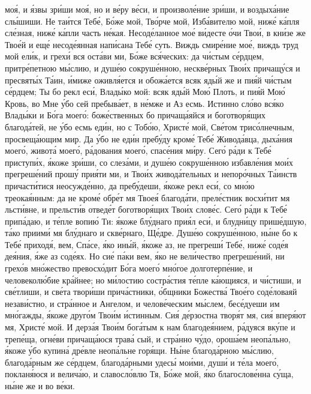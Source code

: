 моя́, и я́звы зри́ши моя́, но и ве́ру ве́си, и произволе́ние зри́ши, и
воздыха́ние слы́шиши. Не таи́тся Тебе́, Бо́же мой, Тво́рче мой, Изба́вителю
мой, ниже́ ка́пля сле́зная, ниже́ ка́пли часть не́кая. Несоде́ланное мое́
ви́десте о́чи Твои́, в кни́зе же Твое́й и еще́ несоде́янная напи́сана Тебе́
суть. Виждь смире́ние мое́, виждь труд мой ели́к, и грехи́ вся оста́ви
ми, Бо́же вся́ческих: да чи́стым се́рдцем, притре́петною мы́слию, и
душе́ю сокруше́нною, нескве́рных Твои́х причащу́ся и пресвяты́х
Та́ин, и́миже оживля́ется и обожа́ется всяк яды́й же и пия́й чи́стым
се́рдцем; Ты бо рекл еси́, Влады́ко мой: всяк яды́й Мою́ Плоть, и пия́й
Мою́ Кровь, во Мне у́бо сей пребыва́ет, в не́мже и Аз есмь. Истинно
сло́во вся́ко Влады́ки и Бо́га моего́: боже́ственных бо причаща́яйся и
боготворя́щих благода́тей, не у́бо есмь еди́н, но с Тобо́ю, Христе́ мой,
Све́том трисо́лнечным, просвеща́ющим мир. Да у́бо не еди́н пребу́ду
кроме́ Тебе́ Живода́вца, дыха́ния моего́, живота́ моего́, ра́дования
моего́, спасе́ния ми́ру. Сего́ ра́ди к Тебе́ приступи́х, я́коже зри́ши,
со слеза́ми, и душе́ю сокруше́нною избавле́ния мои́х прегреше́ний
прошу́ прия́ти ми, и Твои́х живода́тельных и непоро́чных Та́инств
причасти́тися неосужде́нно, да пребу́деши, я́коже рекл еси́, со мно́ю
треокая́нным: да не кроме́ обре́т мя Твоея́ благода́ти, преле́стник восхи́тит
мя льсти́вне, и прельсти́в отведе́т боготворя́щих Твои́х слове́с. Сего́ ра́ди
к Тебе́ припа́даю, и те́пле вопию́ Ти: я́коже блу́днаго прия́л еси́, и
блудни́цу прише́дшую, та́ко приими́ мя блу́днаго и скве́рнаго, Ще́дре.
Душе́ю сокруше́нною, ны́не бо к Тебе́ приходя́, вем, Спа́се, я́ко ины́й,
я́коже аз, не прегреши́ Тебе́, ниже́ соде́я дея́ния, я́же аз соде́ях. Но
сие́ па́ки вем, я́ко не вели́чество прегреше́ний, ни грехо́в мно́жество
превосхо́дит Бо́га моего́ мно́гое долготерпе́ние, и человеколю́бие кра́йнее; но
ми́лостию состра́стия те́пле ка́ющияся, и чи́стиши, и све́тлиши, и
све́та твори́ши прича́стники, о́бщники Божества́ Твое́го соде́ловаяй
незави́стно, и стра́нное и Ангелом, и челове́ческим мы́слем, бесе́дуеши им
мно́гажды, я́коже друго́м Твои́м и́стинным. Сия́ де́рзостна творя́т
мя, сия́ вперя́ют мя, Христе́ мой. И дерза́я Твои́м бога́тым к нам
благодея́нием, ра́дуяся вку́пе и трепе́ща, огне́ви причаща́юся трава́
сый, и стра́нно чу́до, ороша́ем неопа́льно, я́коже у́бо купина́ дре́вле
неопа́льне горя́щи. Ны́не благода́рною мы́слию, благода́рным же се́рдцем,
благода́рными удесы́ мои́ми, души́ и те́ла моего́, покланя́юся и велича́ю, и
славосло́влю Тя, Бо́же мой, я́ко благослове́нна су́ща, ны́не же и во
ве́ки.




